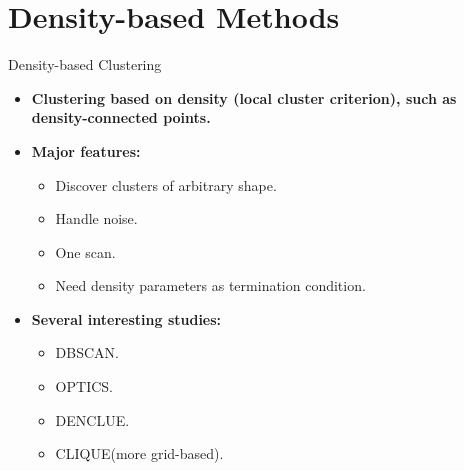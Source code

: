 \section{Density-based Methods}

\begin{frame}{Density-based Clustering}
	\begin{itemize}
		\item \textbf{Clustering based on density (local cluster criterion),
			      such as density-connected points.}
		\item \textbf{Major features:}
		      \begin{itemize}
			      \item Discover clusters of arbitrary shape.
			      \item Handle noise.
			      \item One scan.
			      \item Need density parameters as termination condition.
		      \end{itemize}
		\item \textbf{Several interesting studies:}
		      \begin{itemize}
			      \item DBSCAN.
			      \item OPTICS.
			      \item DENCLUE.
			      \item CLIQUE(more grid-based).
		      \end{itemize}
	\end{itemize}
\end{frame}

